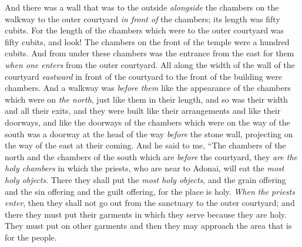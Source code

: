 \begin{biblechapter}
\verse And there was a wall that was to the outside \textit{alongside} the chambers on the walkway to the outer courtyard \textit{in front of} the chambers; its length was fifty cubits.
\verse For the length of the chambers which were to the outer courtyard was fifty cubits, and look! The chambers on the front of the temple were a hundred cubits.
\verse And from under these chambers was the entrance from the east for them \textit{when one enters} from the outer courtyard.
\verse All along the width of the wall of the courtyard \textit{eastward} in front of the courtyard to the front of the building were chambers.
\verse And a walkway was \textit{before them} like the appearance of the chambers which were on \textit{the north}, just like them in their length, and so was their width and all their exits, and they were built like their arrangements and like their doorways,
\verse and like the doorways of the chambers which were on the way of the south was a doorway at the head of the way \textit{before} the stone wall, projecting on the way of the east at their coming.
\verse And he said to me, “The chambers of the north and the chambers of the south which are \textit{before} the courtyard, they \textit{are the holy chambers} in which the priests, who are near to Adonai, will eat the \textit{most holy objects}. There they shall put the \textit{most holy objects}, and the grain offering and the sin offering and the guilt offering, for the place is holy.
\verse \textit{When the priests enter}, then they shall not go out from the sanctuary to the outer courtyard; and there they must put their garments in which they serve because they are holy. They must put on other garments and then they may approach the area that is for the people.

\end{biblechapter}

